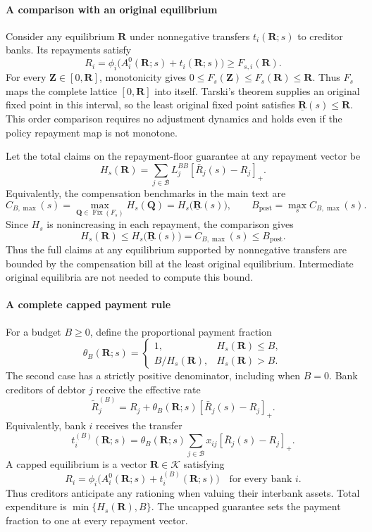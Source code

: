 \paragraph{A comparison with an original equilibrium}
Consider any equilibrium $\mathbf{R}$ under nonnegative transfers $t_i(\mathbf{R};s)$ to
creditor banks. Its repayments satisfy
\[
 R_i=\phi_i\bigl(A_i^0(\mathbf{R};s)+t_i(\mathbf{R};s)\bigr)
 \geq F_{s,i}(\mathbf{R}).
\]
For every $\mathbf{Z}\in[0,\mathbf{R}]$, monotonicity gives $0\leq F_s(\mathbf{Z})\leq F_s(\mathbf{R})\leq \mathbf{R}$. Thus $F_s$ maps the complete lattice $[0,\mathbf{R}]$ into itself. Tarski's theorem supplies an original fixed point in this interval, so the least original fixed point satisfies $\underline{\mathbf{R}}(s)\leq \mathbf{R}$. This order comparison requires no adjustment dynamics and holds even if the policy repayment map is not monotone.

Let the total claims on the repayment-floor guarantee at any repayment
vector be
\[
 H_s(\mathbf{R})=\sum_{j\in\mathcal B}L_j^{BB}[\bar R_j(s)-R_j]_+.
\]
Equivalently, the compensation benchmarks in the main text are
\[
 C_{B,\max}(s)=\max_{\mathbf{Q}\in\operatorname{Fix}(F_s)}H_s(\mathbf{Q})=H_s\bigl(\underline{\mathbf{R}}(s)\bigr),
 \qquad B_{\mathrm{post}}=\max_s C_{B,\max}(s).
\]
Since $H_s$ is nonincreasing in each repayment, the comparison gives
\begin{equation}
 H_s(\mathbf{R})\leq H_s\bigl(\underline{\mathbf{R}}(s)\bigr)=C_{B,\max}(s)\leq B_{\mathrm{post}}.
 \label{eq:repayment-floor-budget-bound}
\end{equation}
Thus the full claims at any equilibrium supported by nonnegative transfers are bounded by the compensation bill at the least original equilibrium. Intermediate original equilibria are not needed to compute this bound.

\paragraph{A complete capped payment rule}
For a budget $B\geq0$, define the proportional payment fraction
\[
 \theta_B(\mathbf{R};s)=
 \begin{cases}
 1,& H_s(\mathbf{R})\leq B,\\
 B/H_s(\mathbf{R}),& H_s(\mathbf{R})>B.
 \end{cases}
\]
The second case has a strictly positive denominator, including when $B=0$.
Bank creditors of debtor $j$ receive the effective rate
\[
 \widetilde R_j^{(B)}=R_j+\theta_B(\mathbf{R};s)[\bar R_j(s)-R_j]_+.
\]
Equivalently, bank $i$ receives the transfer
\[
 t_i^{(B)}(\mathbf{R};s)=\theta_B(\mathbf{R};s)
       \sum_{j\in\mathcal B}x_{ij}[\bar R_j(s)-R_j]_+.
\]
A capped equilibrium is a vector $\mathbf{R}\in\mathcal K$ satisfying
\[
 R_i=\phi_i\bigl(A_i^0(\mathbf{R};s)+t_i^{(B)}(\mathbf{R};s)\bigr)
 \quad\text{for every bank }i.
\]
Thus creditors anticipate any rationing when valuing their interbank assets. Total expenditure is $\min\{H_s(\mathbf{R}),B\}$. The uncapped guarantee sets the payment fraction to one at every repayment vector.


